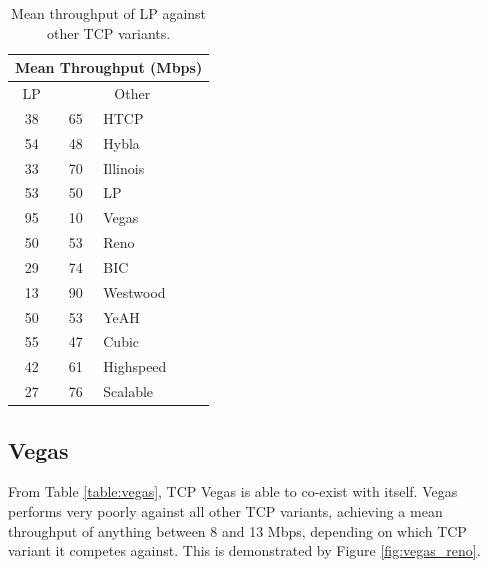 \documentclass[11pt,a4paper,twocolumn]{article}
\begin{document}
\begin{table}[h!]
	\begin{center}
		\begin{tabular}{| c | c | l |}
    			\hline
			\multicolumn{3}{|c|}{Mean Throughput (Mbps)} \\
    			\hline
    			LP &  \multicolumn{2}{|c|}{Other}  \\
			\hline
    			38 & 65 & HTCP \\
			\hline
    			54 & 48 & Hybla \\
			\hline
    			33 & 70 & Illinois \\
			\hline
    			53 & 50 & LP \\
			\hline
    			95 & 10 & Vegas \\
			\hline
    			50 & 53 & Reno \\
			\hline
    			29 & 74 & BIC \\
			\hline
    			13 & 90 & Westwood \\
			\hline
    			50 & 53 & YeAH \\
			\hline
    			55 & 47 & Cubic \\
			\hline
    			42 & 61 & Highspeed \\
			\hline
    			27 & 76 & Scalable \\
    			\hline
    		\end{tabular}
  	\end{center}
  	\caption{Mean throughput of LP against other TCP variants.}
	\label{table:lp}
\end{table}

\subsection{Vegas}
\label{subsec:vegas}
From Table \ref{table:vegas}, TCP Vegas is able to co-exist with itself. Vegas performs very poorly against
all other TCP variants, achieving a mean throughput of anything between 8 and 13 Mbps, depending on which TCP variant it competes against.
This is demonstrated by Figure \ref{fig:vegas_reno}.
\end{document}
